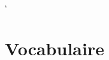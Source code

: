 \documentclass[a4paper, 10pt]{article}
\begin{document}












\appendix
\newpage
\clearpage
{} %
\setcounter{page}{1} %

`\section{Vocabulaire}
\end{document}
